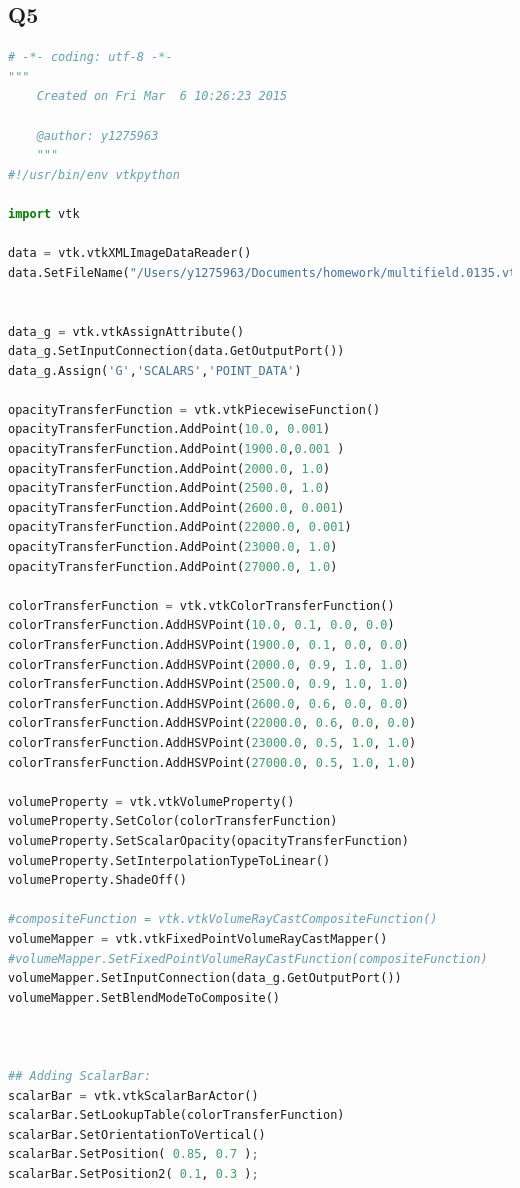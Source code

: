 \documentclass[11pt]{scrartcl}
\begin{document}
\subsection{Q5}
\label{code:Q5}
\begin{lstlisting}[language=Python]
# -*- coding: utf-8 -*-
"""
    Created on Fri Mar  6 10:26:23 2015
    
    @author: y1275963
    """
#!/usr/bin/env vtkpython

import vtk

data = vtk.vtkXMLImageDataReader()
data.SetFileName("/Users/y1275963/Documents/homework/multifield.0135.vti")


data_g = vtk.vtkAssignAttribute()
data_g.SetInputConnection(data.GetOutputPort())
data_g.Assign('G','SCALARS','POINT_DATA')

opacityTransferFunction = vtk.vtkPiecewiseFunction()
opacityTransferFunction.AddPoint(10.0, 0.001)
opacityTransferFunction.AddPoint(1900.0,0.001 )
opacityTransferFunction.AddPoint(2000.0, 1.0)
opacityTransferFunction.AddPoint(2500.0, 1.0)
opacityTransferFunction.AddPoint(2600.0, 0.001)
opacityTransferFunction.AddPoint(22000.0, 0.001)
opacityTransferFunction.AddPoint(23000.0, 1.0)
opacityTransferFunction.AddPoint(27000.0, 1.0)

colorTransferFunction = vtk.vtkColorTransferFunction()
colorTransferFunction.AddHSVPoint(10.0, 0.1, 0.0, 0.0)
colorTransferFunction.AddHSVPoint(1900.0, 0.1, 0.0, 0.0)
colorTransferFunction.AddHSVPoint(2000.0, 0.9, 1.0, 1.0)
colorTransferFunction.AddHSVPoint(2500.0, 0.9, 1.0, 1.0)
colorTransferFunction.AddHSVPoint(2600.0, 0.6, 0.0, 0.0)
colorTransferFunction.AddHSVPoint(22000.0, 0.6, 0.0, 0.0)
colorTransferFunction.AddHSVPoint(23000.0, 0.5, 1.0, 1.0)
colorTransferFunction.AddHSVPoint(27000.0, 0.5, 1.0, 1.0)

volumeProperty = vtk.vtkVolumeProperty()
volumeProperty.SetColor(colorTransferFunction)
volumeProperty.SetScalarOpacity(opacityTransferFunction)
volumeProperty.SetInterpolationTypeToLinear()
volumeProperty.ShadeOff()

#compositeFunction = vtk.vtkVolumeRayCastCompositeFunction()
volumeMapper = vtk.vtkFixedPointVolumeRayCastMapper()
#volumeMapper.SetFixedPointVolumeRayCastFunction(compositeFunction)
volumeMapper.SetInputConnection(data_g.GetOutputPort())
volumeMapper.SetBlendModeToComposite()



## Adding ScalarBar:
scalarBar = vtk.vtkScalarBarActor()
scalarBar.SetLookupTable(colorTransferFunction)
scalarBar.SetOrientationToVertical()
scalarBar.SetPosition( 0.85, 0.7 );
scalarBar.SetPosition2( 0.1, 0.3 );


\end{lstlisting}
\end{document}

